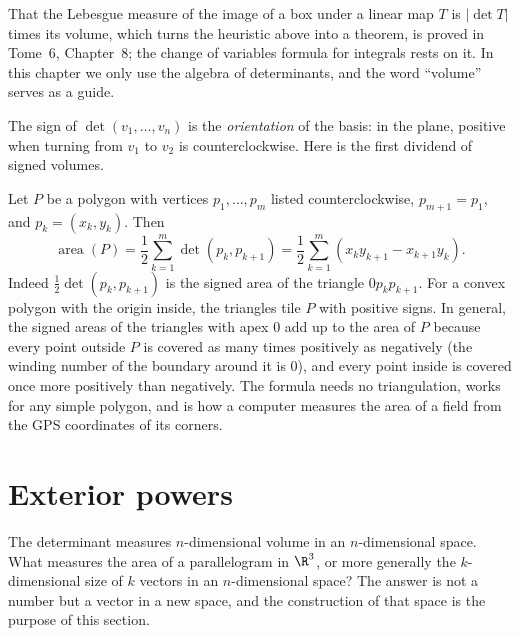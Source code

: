 \begin{remark}
That the Lebesgue measure of the image of a box under a linear map $T$ is $|\det T|$ times its volume, which turns the
heuristic above into a theorem, is proved in Tome~6, Chapter~8; the change of variables formula for integrals rests on
it. In this chapter we only use the algebra of determinants, and the word ``volume'' serves as a guide.
\end{remark}

The sign of $\det(v_1,\dots,v_n)$ is the \emph{orientation} of the basis: in the plane, positive when turning from $v_1$
to $v_2$ is counterclockwise. Here is the first dividend of signed volumes.

\begin{example}\label{ex:shoelace}
Let $P$ be a polygon with vertices $p_1,\dots,p_m$ listed counterclockwise, $p_{m+1}=p_1$, and $p_k=(x_k,y_k)$. Then
\[
\operatorname{area}(P)=\frac12\sum_{k=1}^m\det(p_k,p_{k+1})=\frac12\sum_{k=1}^m(x_ky_{k+1}-x_{k+1}y_k).
\]
Indeed $\frac12\det(p_k,p_{k+1})$ is the signed area of the triangle $0p_kp_{k+1}$. For a convex polygon with the origin
inside, the triangles tile $P$ with positive signs. In general, the signed areas of the triangles with apex $0$ add up
to the area of $P$ because every point outside $P$ is covered as many times positively as negatively (the winding number
of the boundary around it is $0$), and every point inside is covered once more positively than negatively. The formula
needs no triangulation, works for any simple polygon, and is how a computer measures the area of a field from the GPS
coordinates of its corners.
\end{example}

\section{Exterior powers}\label{sec:exterior}

The determinant measures $n$-dimensional volume in an $n$-dimensional space. What measures the area of a parallelogram
in $\R^3$, or more generally the $k$-dimensional size of $k$ vectors in an $n$-dimensional space? The answer is not a
number but a vector in a new space, and the construction of that space is the purpose of this section.


